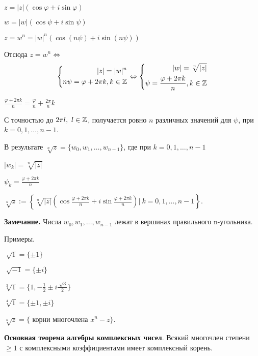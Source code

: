 $z = |z|(\cos \varphi + i \sin \varphi)$

$w = |w|(\cos \psi + i \sin \psi)$

$z = w^n = |w|^n (\cos (n \psi) + i \sin (n \psi))$

Отсюда $z = w^n \Leftrightarrow$ \begin{equation*}
	\left\{
		\begin{aligned}
			|z| = |w|^n  \\
			n \psi = \varphi + 2 \pi k, k \in \mathbb{Z} 
		\end{aligned}
	\right. \Leftrightarrow \left\{
		\begin{aligned}
			|w| = \sqrt[n]{|z|}  \\
			\psi = \frac{\varphi + 2 \pi k}{n}, k \in \mathbb{Z}
		\end{aligned}
	\right.
\end{equation*}

$\frac{\varphi + 2 \pi k}{n} = \frac{\varphi}{n} + \frac{2 \pi}{n} k$

С точностью до $2 \pi l, \ l \in \mathbb{Z}$, получается ровно $n$ различных значений для $\psi$, при $k = 0,1, \dots, n-1$.

В результате $\sqrt[n]{z} = \{w_0, w_1, \dots, w_{n-1} \}$, где при $k = 0, 1, \dots, n-1$ 

$|w_k| = \sqrt[n]{|z|}$

$\psi_k = \frac{\varphi + 2 \pi k}{n}$

\vspace{\baselineskip}
$\sqrt[n]{z} := \left\{ \sqrt[n]{|z|} \left( \cos \frac{\varphi + 2 \pi k}{n} + i \sin \frac{\varphi + 2 \pi k}{n} \right) | \ k = 0, 1, \dots, n-1  \right\}$.

\vspace{\baselineskip}
\textbf{Замечание.} Числа $w_0, w_1, \dots, w_{n-1}$ лежат в вершинах правильного n-угольника.

\vspace{\baselineskip}
Примеры. 

$\sqrt[]{1} = \{\pm 1\}$

$\sqrt[]{-1} = \{\pm i\}$

$\sqrt[3]{1} = \{1, -\frac{1}{2} \pm i \frac{\sqrt[]{3}}{2} \}$

$\sqrt[4]{1} = \{ \pm 1, \pm i \}$

\vspace{\baselineskip}
$\sqrt[n]{z} = \{$ корни многочлена $x^n - z \}$.

\vspace{\baselineskip}
\textbf{Основная теорема алгебры комплексных чисел}. Всякий многочлен степени $\geq 1$ с комплексными коэффициентами имеет комплексный корень.

